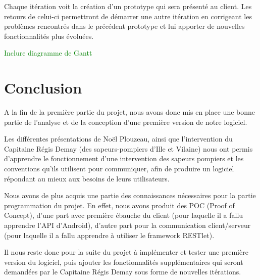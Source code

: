 \documentclass{article}
\newcommand{\todo}[1]{\textcolor{green}{#1}}
\begin{document}
Chaque itération voit la création d’un prototype qui sera présenté au client. Les retours de celui-ci permettront de démarrer une autre itération en corrigeant les problèmes rencontrés dans le précédent prototype et lui apporter de nouvelles fonctionnalités plus évoluées.

\todo{Inclure diagramme de Gantt}

\section*{Conclusion}
A la fin de la première partie du projet, nous avons donc mis en place une bonne partie de l’analyse et de la conception d’une première version de notre logiciel.

Les différentes présentations de Noël Plouzeau, ainsi que l’intervention du Capitaine Régis Demay (des sapeurs-pompiers d’Ille et Vilaine) nous ont permis d’apprendre le fonctionnement d’une intervention des sapeurs pompiers et les conventions qu’ils utilisent pour communiquer, afin de produire un logiciel répondant au mieux aux besoins de leurs utilisateurs.

Nous avons de plus acquis une partie des connaissances nécessaires pour la partie programmation du projet. En effet, nous avons produit des POC (Proof of Concept), d’une part  avec première ébauche du client (pour laquelle il a fallu apprendre l’API d’Android), d’autre part pour la communication client/serveur (pour laquelle il a fallu apprendre à utiliser le framework RESTlet).

Il nous reste donc pour la suite du projet à implémenter et tester une première version du logiciel, puis ajouter les fonctionnalités supplémentaires qui seront demandées par le Capitaine Régis Demay sous forme de nouvelles itérations.
\end{document}
